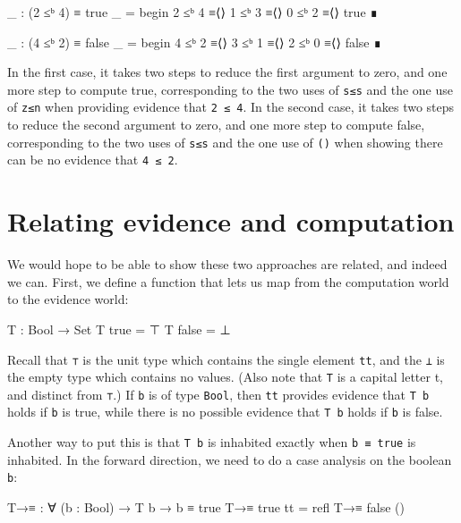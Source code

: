 \begin{fence}
\begin{code}
_ : (2 ≤ᵇ 4) ≡ true
_ =
  begin
    2 ≤ᵇ 4
  ≡⟨⟩
    1 ≤ᵇ 3
  ≡⟨⟩
    0 ≤ᵇ 2
  ≡⟨⟩
    true
  ∎

_ : (4 ≤ᵇ 2) ≡ false
_ =
  begin
    4 ≤ᵇ 2
  ≡⟨⟩
    3 ≤ᵇ 1
  ≡⟨⟩
    2 ≤ᵇ 0
  ≡⟨⟩
    false
  ∎
\end{code}
\end{fence}

In the first case, it takes two steps to reduce the first argument to
zero, and one more step to compute true, corresponding to the two uses
of \texttt{s≤s} and the one use of \texttt{z≤n} when providing evidence
that \texttt{2\ ≤\ 4}. In the second case, it takes two steps to reduce
the second argument to zero, and one more step to compute false,
corresponding to the two uses of \texttt{s≤s} and the one use of
\texttt{()} when showing there can be no evidence that \texttt{4\ ≤\ 2}.

\hypertarget{relating-evidence-and-computation}{%
\section{Relating evidence and
computation}\label{relating-evidence-and-computation}}

We would hope to be able to show these two approaches are related, and
indeed we can. First, we define a function that lets us map from the
computation world to the evidence world:

\begin{fence}
\begin{code}
T : Bool → Set
T true   =  ⊤
T false  =  ⊥
\end{code}
\end{fence}

Recall that \texttt{⊤} is the unit type which contains the single
element \texttt{tt}, and the \texttt{⊥} is the empty type which contains
no values. (Also note that \texttt{T} is a capital letter t, and
distinct from \texttt{⊤}.) If \texttt{b} is of type \texttt{Bool}, then
\texttt{tt} provides evidence that \texttt{T\ b} holds if \texttt{b} is
true, while there is no possible evidence that \texttt{T\ b} holds if
\texttt{b} is false.

Another way to put this is that \texttt{T\ b} is inhabited exactly when
\texttt{b\ ≡\ true} is inhabited. In the forward direction, we need to
do a case analysis on the boolean \texttt{b}:

\begin{fence}
\begin{code}
T→≡ : ∀ (b : Bool) → T b → b ≡ true
T→≡ true tt   =  refl
T→≡ false ()
\end{code}
\end{fence}

